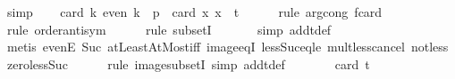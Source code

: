 \begin{isabellebody}
\ simp\isanewline
\isanewline
\ \ \isamarkupfalse%
\ {\isachardoublequoteopen}card\ {\isacharparenleft}{\kern0pt}{\isacharbraceleft}{\kern0pt}k{\isachardot}{\kern0pt}\ even\ k{\isacharbraceright}{\kern0pt}\ {\isasyminter}\ {\isacharbraceleft}{\kern0pt}{}{\isachardot}{\kern0pt}{\isachardot}{\kern0pt}{\isacharless}{\kern0pt}p{\isacharbraceright}{\kern0pt}{\isacharparenright}{\kern0pt}\ {\isacharequal}{\kern0pt}\ card\ {\isacharparenleft}{\kern0pt}{\isacharparenleft}{\kern0pt}{\isasymlambda}x{\isachardot}{\kern0pt}\ {}{\isacharasterisk}{\kern0pt}x{\isacharparenright}{\kern0pt}\ {\isacharbackquote}{\kern0pt}\ {\isacharbraceleft}{\kern0pt}{}{\isachardot}{\kern0pt}{\isachardot}{\kern0pt}t{\isacharbraceright}{\kern0pt}{\isacharparenright}{\kern0pt}{\isachardoublequoteclose}\isanewline
\ \ \ \ \isamarkupfalse%
\ {\isacharparenleft}{\kern0pt}rule\ arg{\isacharunderscore}{\kern0pt}cong{\isacharbrackleft}{\kern0pt}\ f{\isacharequal}{\kern0pt}{\isachardoublequoteopen}card{\isachardoublequoteclose}{\isacharbrackright}{\kern0pt}{\isacharparenright}{\kern0pt}\isanewline
\ \ \ \ \isamarkupfalse%
\ {\isacharparenleft}{\kern0pt}rule\ order{\isacharunderscore}{\kern0pt}antisym{\isacharparenright}{\kern0pt}\isanewline
\ \ \ \ \isamarkupfalse%
\ {\isacharparenleft}{\kern0pt}rule\ subsetI{\isacharparenright}{\kern0pt}\isanewline
\ \ \ \ \ \isamarkupfalse%
\ {\isacharparenleft}{\kern0pt}simp\ add{\isacharcolon}{\kern0pt}t{\isacharunderscore}{\kern0pt}def{\isacharparenright}{\kern0pt}\isanewline
\ \ \ \ \ \isamarkupfalse%
\ {\isacharparenleft}{\kern0pt}metis\ evenE\ Suc{\isacharunderscore}{\kern0pt}{}\ atLeastAtMost{\isacharunderscore}{\kern0pt}iff\ image{\isacharunderscore}{\kern0pt}eqI\ less{\isacharunderscore}{\kern0pt}Suc{\isacharunderscore}{\kern0pt}eq{\isacharunderscore}{\kern0pt}le\ mult{\isacharunderscore}{\kern0pt}less{\isacharunderscore}{\kern0pt}cancel{}\ not{\isacharunderscore}{\kern0pt}less\ zero{\isacharunderscore}{\kern0pt}less{\isacharunderscore}{\kern0pt}Suc{\isacharparenright}{\kern0pt}\isanewline
\ \ \ \ \isamarkupfalse%
\ {\isacharparenleft}{\kern0pt}rule\ image{\isacharunderscore}{\kern0pt}subsetI{\isacharcomma}{\kern0pt}\ simp\ add{\isacharcolon}{\kern0pt}t{\isacharunderscore}{\kern0pt}def{\isacharparenright}{\kern0pt}\isanewline
\ \ \isamarkupfalse%
\ \isamarkupfalse%
\ {\isachardoublequoteopen}{\isachardot}{\kern0pt}{\isachardot}{\kern0pt}{\isachardot}{\kern0pt}\ {\isacharequal}{\kern0pt}\ card\ {\isacharbraceleft}{\kern0pt}{}{\isachardot}{\kern0pt}{\isachardot}{\kern0pt}t{\isacharbraceright}{\kern0pt}{\isachardoublequoteclose}\ \isanewline

\end{isabellebody}
